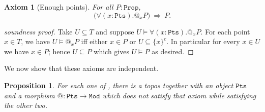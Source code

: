\documentclass[reqno,11pt]{amsproc}
\makeatletter
\theoremstyle{plain}
\newtheorem{proposition}[theorem]{Proposition}
\newtheorem{axiom}[theorem]{Axiom}\crefname{axiom}{Axiom}{Axioms}
\theoremstyle{definition}
\newenvironment{soundproof}{\begin{proof}[soundness proof]}{\end{proof}}
\newcommand{\Const}[1]{\mathtt{#1}}
\renewcommand{\to}[1][]{\xrightarrow{#1}}
\newcommand{\prop}{\Const{Prop}}
\newcommand{\pt}{x}
\newcommand{\pts}{\mathtt{Pts}}		%
\newcommand{\modts}{\mathtt{Mod}}		%
\newcommand{\atsymbol}{{@}}
\newcommand{\at}[1][\pt]{\atsymbol_{#1}}
\numberwithin{equation}{section}
\makeatother
\begin{document}
\begin{axiom}[Enough points]
	\label{ax.enough_pts}
	For all $P : \prop$,
	\[
		\big( \forall (\pt : \pts). \at P \big) \: \Rightarrow \: P.
	\]
\end{axiom}

\begin{soundproof}
Take $U\subseteq T$ and suppose $U\models\forall (\pt : \pts). \at P$. For each point $\pt\in T$, we have $U\models\at P$ iff either $\pt\in P$ or $U\subseteq\{\pt\}^c$. In particular for every $\pt\in U$ we have $\pt\in P$; hence $U\subseteq P$ which gives $U\models P$ as desired.
\end{soundproof}

We now show that these axioms are independent.

\begin{proposition}
	For each one of , there is a topos together with an object $\pts$ and a morphism $\at[] \colon \pts \to \modts$ which does not satisfy that axiom while satisfying the other two.
\end{proposition}
\end{document}
